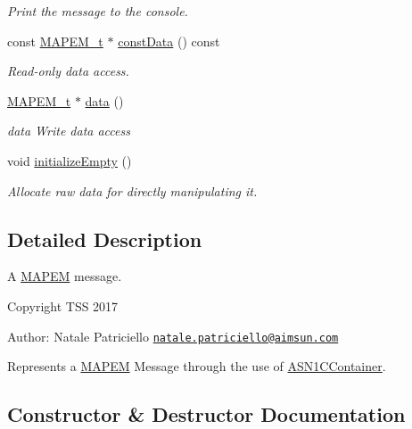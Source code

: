 \begin{DoxyCompactItemize}
\begin{DoxyCompactList}\small\item\em Print the message to the console. \end{DoxyCompactList}\item 
const \hyperlink{structMAPEM}{M\+A\+P\+E\+M\+\_\+t} $\ast$ \hyperlink{classMAPEMMessage_acfc84788bed50dd231de28f97a4db31c}{const\+Data} () const 
\begin{DoxyCompactList}\small\item\em Read-\/only data access. \end{DoxyCompactList}\item 
\hyperlink{structMAPEM}{M\+A\+P\+E\+M\+\_\+t} $\ast$ \hyperlink{classMAPEMMessage_a94c0a385a5b64d0e32463c13d69bb555}{data} ()
\begin{DoxyCompactList}\small\item\em data Write data access \end{DoxyCompactList}\item 
void \hyperlink{classMAPEMMessage_a17cac4381fb0586d60644c002f47b6c0}{initialize\+Empty} ()\hypertarget{classMAPEMMessage_a17cac4381fb0586d60644c002f47b6c0}{}\label{classMAPEMMessage_a17cac4381fb0586d60644c002f47b6c0}

\begin{DoxyCompactList}\small\item\em Allocate raw data for directly manipulating it. \end{DoxyCompactList}\end{DoxyCompactItemize}


\subsection{Detailed Description}
A \hyperlink{structMAPEM}{M\+A\+P\+EM} message. 

Copyright T\+SS 2017

Author\+: Natale Patriciello \href{mailto:natale.patriciello@aimsun.com}{\tt natale.\+patriciello@aimsun.\+com}

Represents a \hyperlink{structMAPEM}{M\+A\+P\+EM} Message through the use of \hyperlink{classASN1CContainer}{A\+S\+N1\+C\+Container}. 

\subsection{Constructor \& Destructor Documentation}
